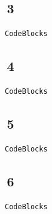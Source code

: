 \documentclass{article}
\begin{document}
\subsection{\,3}
\begin{center}
\begin{lstlisting}[language=Java]
CodeBlocks
\end{lstlisting}
\end{center}
\subsection{\,4}
\begin{center}
\begin{lstlisting}[language=Java]
CodeBlocks
\end{lstlisting}
\end{center}
\subsection{\,5}
\begin{center}
\begin{lstlisting}[language=Java]
CodeBlocks
\end{lstlisting}
\end{center}
\subsection{\,6}
\begin{center}
\begin{lstlisting}[language=Java]
CodeBlocks
\end{lstlisting}
\end{center}
\end{document}
